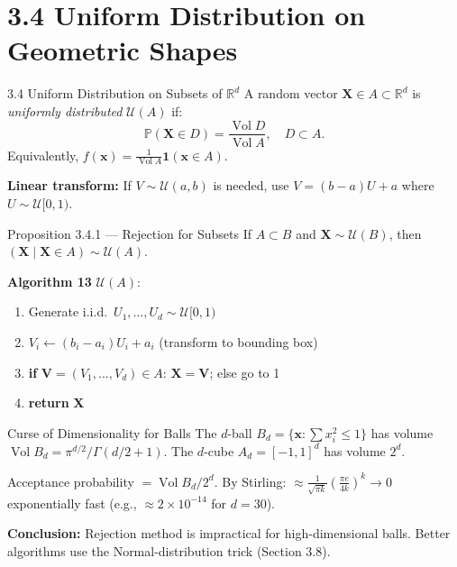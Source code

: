 \documentclass[aspectratio=169,10pt]{beamer}
\newcommand{\PP}{\mathbb{P}}
\newcommand{\RR}{\mathbb{R}}
\newcommand{\UU}{\mathcal{U}}
\DeclareMathOperator{\Vol}{Vol}
\begin{document}
\section{3.4 Uniform Distribution on Geometric Shapes}

\begin{frame}[allowframebreaks]{3.4 Uniform Distribution on Subsets of $\RR^d$}
  A random vector $\mathbf{X}\in A\subset\RR^d$ is \emph{uniformly distributed}
  $\UU(A)$ if:
  \[
    \PP(\mathbf{X}\in D) = \frac{\Vol D}{\Vol A}, \quad D\subset A.
  \]
  Equivalently, $f(\mathbf{x}) = \frac{1}{\Vol A}\mathbf{1}(\mathbf{x}\in A)$.

  \medskip
  \textbf{Linear transform:} If $V\sim\UU(a,b)$ is needed, use $V=(b-a)U+a$
  where $U\sim\UU[0,1)$.

  \medskip
  \begin{block}{Proposition 3.4.1 --- Rejection for Subsets}
    If $A\subset B$ and $\mathbf{X}\sim\UU(B)$, then
    $(\mathbf{X}\mid\mathbf{X}\in A)\sim\UU(A)$.
  \end{block}

  \framebreak

  \textbf{Algorithm 13} $\UU(A)$:
  \begin{enumerate}
    \item Generate i.i.d.\ $U_1,\ldots,U_d\sim\UU[0,1)$
    \item $V_i \leftarrow (b_i-a_i)U_i + a_i$ (transform to bounding box)
    \item \textbf{if} $\mathbf{V}=(V_1,\ldots,V_d)\in A$: $\mathbf{X}=\mathbf{V}$; else go to 1
    \item \textbf{return} $\mathbf{X}$
  \end{enumerate}

  \medskip
  \begin{alertblock}{Curse of Dimensionality for Balls}
    The $d$-ball $B_d = \{\mathbf{x}:\sum x_i^2\le 1\}$ has volume
    $\Vol B_d = \pi^{d/2}/\Gamma(d/2+1)$.
    The $d$-cube $A_d=[-1,1]^d$ has volume $2^d$.

    \medskip
    Acceptance probability $= \Vol B_d / 2^d$.
    By Stirling: $\approx \frac{1}{\sqrt{\pi k}}\!\left(\frac{\pi e}{4k}\right)^k\to 0$
    exponentially fast (e.g., $\approx 2\times 10^{-14}$ for $d=30$).
  \end{alertblock}

  \textbf{Conclusion:} Rejection method is impractical for high-dimensional balls.
  Better algorithms use the Normal-distribution trick (Section 3.8).
\end{frame}
\end{document}
